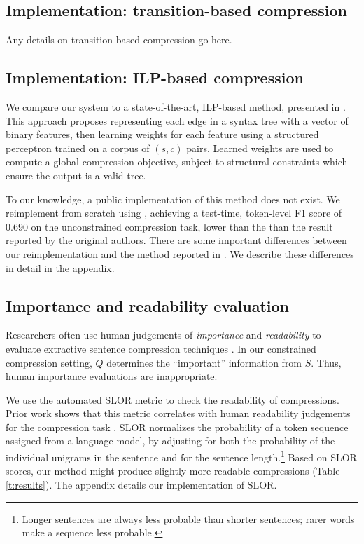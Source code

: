 \documentclass[11pt,a4paper]{article}
\begin{document}
\subsection{Implementation: transition-based compression}\label{s:transition}

Any details on transition-based compression go here.

\subsection{Implementation: ILP-based compression}\label{s:ilp}

We compare our system to a state-of-the-art, ILP-based method, presented in \citet{filippova2013overcoming}. This approach proposes representing each edge in a syntax tree with a vector of binary features, then learning weights for each feature using a structured perceptron trained on a corpus of $(s,c)$ pairs. Learned weights are used to compute a global compression objective, subject to structural constraints which ensure the output is a valid tree.

To our knowledge, a public implementation of this method does not exist. We reimplement from scratch using \citet{gurobi}, achieving a test-time, token-level F1 score of  0.690 on the unconstrained compression task, lower than the than the result reported by the original authors. There are some important differences between our reimplementation and the method reported in \citet{filippova2013overcoming}. We describe these differences in detail in the appendix.

\subsection{Importance and readability evaluation}\label{s:readabilityinformativeness}

Researchers often use human judgements of \textit{importance} and \textit{readability} to evaluate extractive sentence compression techniques \cite{Knight2000StatisticsBasedS,clarke2008global,filippova2015sentence}. In our constrained compression setting, $Q$ determines the ``important'' information from $S$. Thus, human importance evaluations are inappropriate.

We use the automated SLOR metric \cite{lau2015unsupervised} to check the readability of compressions. Prior work shows that this metric correlates with human readability judgements for the compression task \cite{kannConl}. SLOR normalizes the probability of a token sequence assigned from a language model, by adjusting for both the probability of the individual unigrams in the sentence and for the sentence length.\footnote{Longer sentences are always less probable than shorter sentences; rarer words make a sequence less probable.} Based on SLOR scores, our method might produce slightly more readable compressions (Table \ref{t:results}). The appendix details our implementation of SLOR. 
\end{document}
